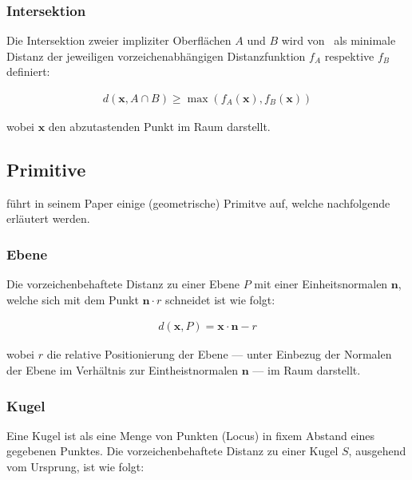 \subsubsection{Intersektion}
\label{ssubsec:implicit_surfaces_ops_intersection}

Die Intersektion zweier impliziter Oberflächen $A$ und $B$ wird
von~\cite{hart_sphere_1994} als minimale Distanz der jeweiligen
vorzeichenabhängigen  Distanzfunktion $f_{A}$ respektive $f_{B}$ definiert:

\begin{gather}
    d(\bm{x}, A \cap B) \geq \max(f_{A}(\bm{x}), f_{B}(\bm{x}))
\end{gather}

wobei $\bm{x}$ den abzutastenden Punkt im Raum darstellt.

\subsection{Primitive}
\label{subsec:implicit_surfaces_primitives}

\cite{hart_sphere_1994} führt in seinem Paper einige (geometrische) Primitve
auf, welche nachfolgende erläutert werden.

\subsubsection{Ebene}
\label{ssubsec:implicit_surfaces_primitives_plane}

Die vorzeichenbehaftete Distanz zu einer Ebene $P$ mit einer Einheitsnormalen $\bm{n}$, welche sich mit dem Punkt $\bm{n} \cdot r$ schneidet ist wie folgt:

\begin{gather}
    d(\bm{x}, P) = \bm{x} \cdot \bm{n} - r
\end{gather}

wobei $r$ die relative Positionierung der Ebene --- unter Einbezug der Normalen der Ebene im Verhältnis zur Eintheistnormalen $\bm{n}$ --- im Raum darstellt.

\subsubsection{Kugel}
\label{ssubsec:implicit_surfaces_primitives_sphere}

Eine Kugel ist als eine Menge von Punkten (Locus) in fixem Abstand eines gegebenen Punktes. Die vorzeichenbehaftete Distanz zu einer Kugel $S$, ausgehend vom Ursprung, ist wie folgt:

